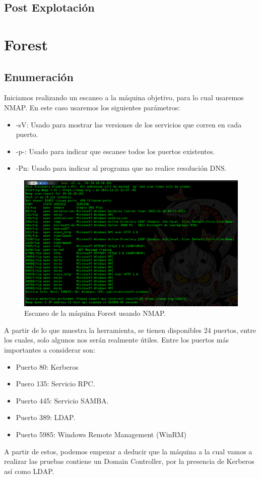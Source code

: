 \documentclass{article}
\begin{document}
\subsection{Post Explotación}




\clearpage 

\section{Forest}
\subsection{Enumeración}
Iniciamos realizando un escaneo a la máquina objetivo, para lo cual usaremos NMAP. En este caso usaremos los siguientes parámetros:

\begin{itemize}
	\item -sV: Usado para mostrar las versiones de los servicios que corren en cada puerto.
	\item -p-: Usado para indicar que escanee todos los puertos existentes.
	\item -Pn: Usado para indicar al programa que no realice resolución DNS.
\end{itemize}
\begin{figure}[H]
	\center
	\includegraphics[width=\textwidth]{images/forest/escaneo_nmap.png}
	\caption{Escaneo de la máquina Forest usando NMAP.}
\end{figure}
A partir de lo que muestra la herramienta, se tienen disponibles 24 puertos, entre los cuales, solo algunos nos serán realmente útiles. Entre los puertos más importantes a considerar son:
\begin{itemize}
	\item Puerto 80: Kerberos
	\item Puero 135: Servicio RPC. 
	\item Puerto 445: Servicio SAMBA.
	\item Puerto 389: LDAP.
	\item Puerto 5985: Windows Remote Management (WinRM) 
\end{itemize}
A partir de estos, podemos empezar a deducir que la máquina a la cual vamos a realizar las pruebas contiene un Domain Controller, por la presencia de Kerberos así como LDAP. 
\end{document}
